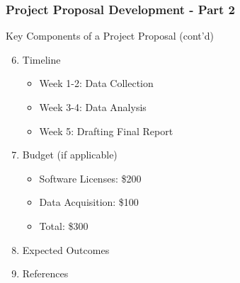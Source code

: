\documentclass[aspectratio=169]{beamer}
\begin{document}
\begin{frame}[fragile]
    \frametitle{Project Proposal Development - Part 2}
    \begin{block}{Key Components of a Project Proposal (cont'd)}
        \begin{enumerate}
            \setcounter{enumi}{5}
            \item Timeline
                \begin{itemize}
                    \item Week 1-2: Data Collection
                    \item Week 3-4: Data Analysis
                    \item Week 5: Drafting Final Report
                \end{itemize}
            \item Budget (if applicable)
                \begin{itemize}
                    \item Software Licenses: \$200
                    \item Data Acquisition: \$100
                    \item Total: \$300
                \end{itemize}
            \item Expected Outcomes
            \item References
        \end{enumerate}
    \end{block}
\end{frame}
\end{document}
